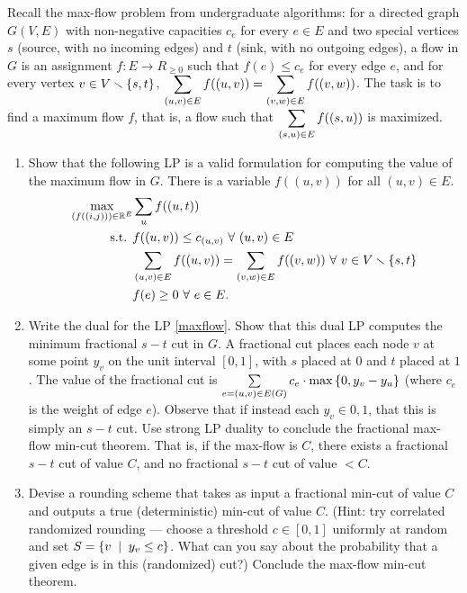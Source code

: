 \pb
Recall the max-flow problem from undergraduate algorithms: for a directed graph $G(V,E)$ with non-negative capacities $c_{e}$ for every $e \in E$ and two special vertices $s$ (source, with no incoming edges) and $t$ (sink, with no outgoing edges), a flow in $G$ is an assignment $f : E \to R_{\ge0}$ such that $f(e)\le c_{e}$ for every edge $e$, and for every vertex $v \in V \smallsetminus\left\{s,t\right\}$, $\displaystyle\sum_{(u,v)\in E} f((u,v)) = \sum_{(v,w)\in E}f((v,w))$. The task is to find a maximum flow $f$, that is, a flow such that $\displaystyle\sum_{(s,u)\in E}f((s,u))$ is maximized.
\begin{enumerate}[label=(\alph*)]
\item Show that the following LP is a valid formulation for computing the value of the maximum flow in $G$. There is a variable $f((u,v))$ for all $(u,v) \in E$.
\begin{equation}\label{maxflow}\begin{aligned}
\max_{(f((i,j)))\in \mathbb{R}^{E}}& \sum_{u}f((u,t))\\
\text{s.t. }& f((u,v)) \le c_{(u,v)}~\forall~ (u,v)\in E\\
& \sum_{(u,v)\in E} f((u,v)) = \sum_{(v,w)\in E}f((v,w))~\forall~ v\in V\smallsetminus\left\{s,t\right\}\\
& f(e)\ge 0~\forall~ e\in E.
\end{aligned}\end{equation}
\item Write the dual for the LP \ref{maxflow}. Show that this dual LP computes the minimum fractional $s-t$ cut in $G$. A fractional cut places each node $v$ at some point $y_{v}$ on the unit interval $[0,1]$, with $s$ placed at $0$ and $t$ placed at $1$. The value of the fractional cut is $\sum\limits_{e=(u,v)\in E(G)} c_{e}\cdot \max\left\{0,y_{v}-y_{u}\right\}$ (where $c_{e}$ is the weight of edge $e$). Observe that if instead each $y_{v} \in {0,1}$, that this is simply an $s-t$ cut. Use strong LP duality to conclude the fractional max-flow min-cut theorem. That is, if the max-flow is $C$, there exists a fractional $s-t$ cut of value $C$, and no fractional $s-t$ cut of value $<C$.
\item Devise a rounding scheme that takes as input a fractional min-cut of value $C$ and outputs a true (deterministic) min-cut of value $C$. (Hint: try correlated randomized rounding — choose a threshold $c \in [0,1]$ uniformly at random and set $S = \set{v\st y_{v} \le c}$. What can you say about the probability that a given edge is in this (randomized) cut?) Conclude the max-flow min-cut theorem.
\end{enumerate}


